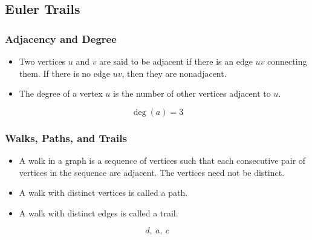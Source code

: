 \documentclass{beamer}
\theoremstyle{Plain}\newtheorem{kt}{Kuratowski's Theorem}
\theoremstyle{Definition}\newtheorem{te}{Tr\'emaux Exploration}
\theoremstyle{Definition}\newtheorem{dfs}{Depth-First Search}
\begin{document}
\subsection{Euler Trails}
\begin{frame}
  \frametitle{Adjacency and Degree}
  \begin{itemize}
    \item Two vertices $u$ and $v$ are said to be \alert{adjacent} if there is an edge $uv$ connecting them. If there is no edge $uv$, then they are nonadjacent.
    \item The \alert{degree} of a vertex $u$ is the number of other vertices adjacent to $u$. 
  \end{itemize}
    \begin{figure}[h]
    \begin{equation*}
      \deg{\left( a \right)} = 3
    \end{equation*}
    \end{figure}
\end{frame}

\begin{frame}
  \frametitle{Walks, Paths, and Trails}
  \begin{itemize}
    \item A \alert{walk} in a graph is a sequence of vertices such that each consecutive pair of vertices in the sequence are adjacent. The vertices need not be distinct.
    \item A walk with distinct vertices is called a \alert{path}.
    \item A walk with distinct edges is called a \alert{trail}.
  \end{itemize}
  \begin{figure}[h]
  \begin{equation*}
    d,\ a,\ c
  \end{equation*}
  \end{figure}
\end{frame}
\end{document}
